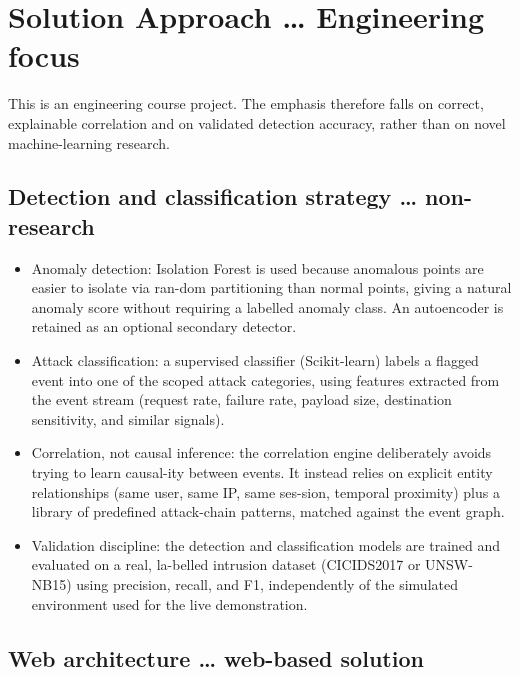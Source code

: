 \documentclass[12pt]{article}
\begin{document}
\section{Solution Approach \ldots{} Engineering focus}

This is an engineering course project. The emphasis therefore falls on correct, explainable correlation and on validated detection accuracy, rather than on novel machine-learning research.

\subsection{Detection and classification strategy \ldots{} non-research}

\begin{itemize}
  \item Anomaly detection: Isolation Forest is used because anomalous points are easier to isolate via ran-dom partitioning than normal points, giving a natural anomaly score without requiring a labelled anomaly class. An autoencoder is retained as an optional secondary detector.
  \item Attack classification: a supervised classifier (Scikit-learn) labels a flagged event into one of the scoped attack categories, using features extracted from the event stream (request rate, failure rate, payload size, destination sensitivity, and similar signals).
\end{itemize}

\begin{itemize}
  \item Correlation, not causal inference: the correlation engine deliberately avoids trying to learn causal-ity between events. It instead relies on explicit entity relationships (same user, same IP, same ses-sion, temporal proximity) plus a library of predefined attack-chain patterns, matched against the event graph.
  \item Validation discipline: the detection and classification models are trained and evaluated on a real, la-belled intrusion dataset (CICIDS2017 or UNSW-NB15) using precision, recall, and F1, independently of the simulated environment used for the live demonstration.
\end{itemize}

\subsection{Web architecture \ldots{} web-based solution}
\end{document}
